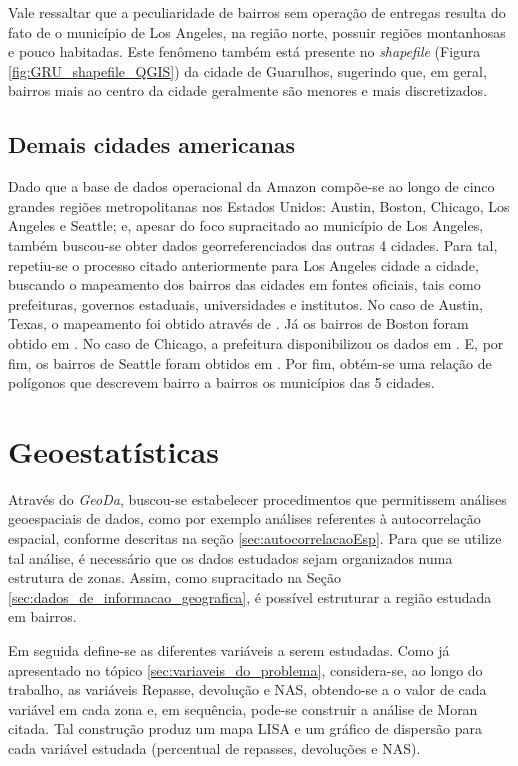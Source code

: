 Vale ressaltar que a peculiaridade de bairros sem operação de entregas resulta do fato de o município de Los Angeles, na região norte, possuir regiões montanhosas e pouco habitadas.
Este fenômeno também está presente no \textit{shapefile} (Figura \ref{fig:GRU_shapefile_QGIS}) da cidade de Guarulhos, sugerindo que, em geral, bairros mais ao centro da cidade geralmente são menores e mais discretizados. 

\subsection{Demais cidades americanas}

Dado que a base de dados operacional da Amazon compõe-se ao longo de cinco grandes regiões metropolitanas nos Estados Unidos: Austin, Boston, Chicago, Los Angeles e Seattle; e, apesar do foco supracitado ao município de Los Angeles, também buscou-se obter dados georreferenciados das outras 4 cidades. 
%
Para tal, repetiu-se o processo citado anteriormente para Los Angeles cidade a cidade, buscando o mapeamento dos bairros das cidades em fontes oficiais, tais como prefeituras, governos estaduais, universidades e institutos. No caso de Austin, Texas, o mapeamento foi obtido através de . Já os bairros de Boston foram obtido em . No caso de Chicago, a prefeitura disponibilizou os dados em . E, por fim, os bairros de Seattle foram obtidos em .
Por fim, obtém-se uma relação de polígonos que descrevem bairro a bairros os municípios das 5 cidades.

\section{Geoestatísticas} \label{GeoDa}

Através do \textit{GeoDa}, buscou-se estabelecer procedimentos que permitissem análises geoespaciais de dados, como por exemplo análises referentes à autocorrelação espacial, conforme descritas na seção \ref{sec:autocorrelacaoEsp}.
%
Para que se utilize tal análise, é necessário que os dados estudados sejam organizados numa estrutura de zonas. 
Assim, como supracitado na Seção \ref{sec:dados_de_informacao_geografica}, é possível estruturar a região estudada em bairros.

Em seguida define-se as diferentes variáveis a serem estudadas. 
Como já apresentado no tópico \ref{sec:variaveis_do_problema}, considera-se, ao longo do trabalho, as variáveis Repasse, devolução e NAS, obtendo-se a o valor de cada variável em cada zona e, em sequência, pode-se construir a análise de Moran citada.
%
Tal construção produz um mapa LISA e um gráfico de dispersão para cada variável estudada (percentual de repasses, devoluções e NAS).

